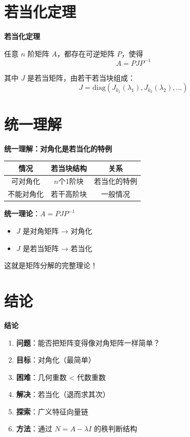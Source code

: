 \documentclass[aspectratio=169,12pt]{beamer}
\begin{document}
\section{若当化定理}

\begin{frame}
\fontsize{11}{13}\selectfont
\centerline{\textbf{若当化定理}}

\bigskip
任意 $n$ 阶矩阵 $A$，都存在可逆矩阵 $P$，使得
\[
A = PJP^{-1}
\]

其中 $J$ 是若当矩阵，由若干若当块组成：
\[
J = \text{diag}(J_{k_1}(\lambda_1), J_{k_2}(\lambda_2), ...)
\]
\end{frame}

\section{统一理解}

\begin{frame}
\fontsize{10}{12}\selectfont
\centerline{\textbf{统一理解：对角化是若当化的特例}}

\begin{center}
\begin{tabular}{|c|c|c|}
\hline
情况 & 若当块结构 & 关系 \\
\hline
可对角化 & $n$个1阶块 & 若当化的特例 \\
\hline
不能对角化 & 若干高阶块 & 一般情况 \\
\hline
\end{tabular}
\end{center}

\pause
\bigskip
\centerline{\textbf{统一理论}：$A = PJP^{-1}$}

\begin{itemize}
    \item $J$ 是对角矩阵 → 对角化
    \item $J$ 是若当矩阵 → 若当化
\end{itemize}

\pause
\bigskip
这就是矩阵分解的完整理论！
\end{frame}

\section{结论}

\begin{frame}
\centerline{\textbf{结论}}

\bigskip
\begin{enumerate}
    \item \textbf{问题}：能否把矩阵变得像对角矩阵一样简单？
    \item \textbf{目标}：对角化（最简单）
    \item \textbf{困难}：几何重数 < 代数重数
    \item \textbf{解决}：若当化（退而求其次）
    \item \textbf{探索}：广义特征向量链
    \item \textbf{方法}：通过 $N = A - \lambda I$ 的秩判断结构
\end{enumerate}
\end{frame}
\end{document}
